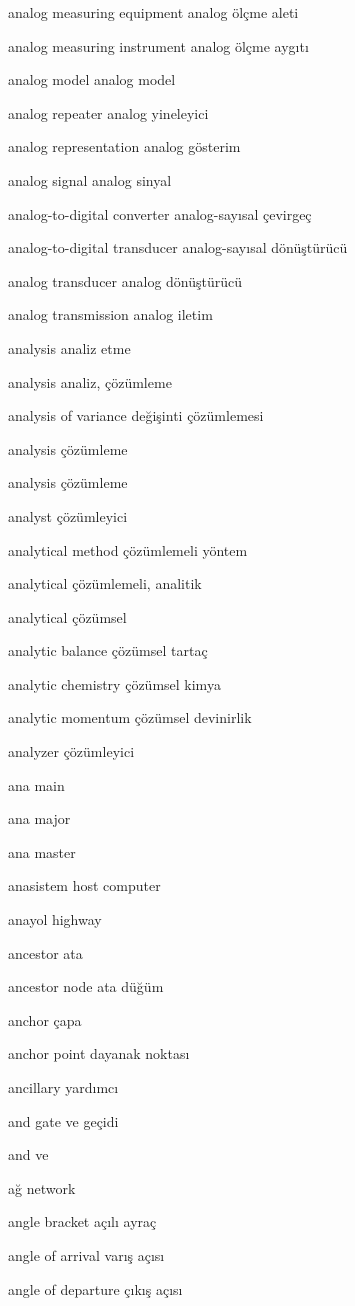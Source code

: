 \documentclass[12pt,fleqn]{article}\usepackage{../../common}
\begin{document}
analog measuring equipment analog ölçme aleti

analog measuring instrument analog ölçme aygıtı

analog model analog model

analog repeater analog yineleyici

analog representation analog gösterim

analog signal analog sinyal

analog-to-digital converter analog-sayısal çevirgeç

analog-to-digital transducer analog-sayısal dönüştürücü

analog transducer analog dönüştürücü

analog transmission analog iletim

analysis analiz etme

analysis analiz, çözümleme

analysis of variance değişinti çözümlemesi

analysis çözümleme

analysis çözümleme

analyst çözümleyici

analytical method çözümlemeli yöntem

analytical çözümlemeli, analitik

analytical çözümsel

analytic balance çözümsel tartaç

analytic chemistry çözümsel kimya

analytic momentum çözümsel devinirlik

analyzer çözümleyici

ana main

ana major

ana master

anasistem host computer

anayol highway

ancestor ata

ancestor node ata düğüm

anchor çapa

anchor point dayanak noktası

ancillary yardımcı

and gate ve geçidi

and ve

ağ network

angle bracket açılı ayraç

angle of arrival varış açısı

angle of departure çıkış açısı
\end{document}
